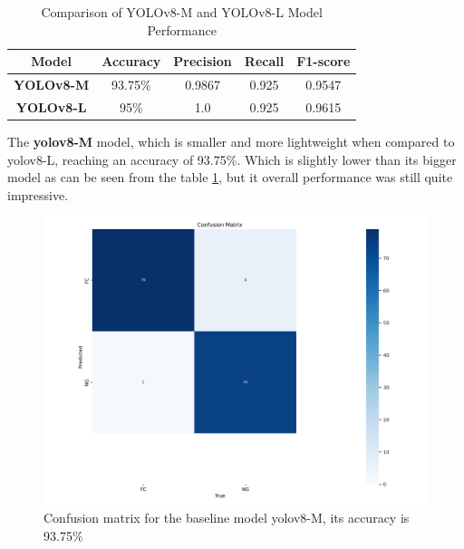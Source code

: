 \begin{table}[ht!]
    \centering
    \begin{tabular}{|c|c|c|c|c|}
        \hline
        \textbf{Model} & \textbf{Accuracy} & \textbf{Precision} & \textbf{Recall} & \textbf{F1-score} \\ \hline
        \textbf{YOLOv8-M} & 93.75\% & 0.9867 & 0.925 & 0.9547 \\ \hline
        \textbf{YOLOv8-L} & 95\% & 1.0 & 0.925 & 0.9615 \\ \hline
    \end{tabular}
    \caption{Comparison of YOLOv8-M and YOLOv8-L Model Performance}
    \label{tab:yolov8_performance}
\end{table}


The \textbf{\gls{yolo}v8-M} model, which is smaller and more lightweight when compared to \gls{yolo}v8-L, reaching an accuracy of 93.75\%. Which is slightly lower than its bigger model as can be seen from the table \ref{tab:yolov8_performance}, but it overall performance was still quite impressive.

\begin{figure}[ht!]
    \centering
    \includegraphics[width=1.3\linewidth]{Rohit_Master_Thesis//Images/yolov8m_confusion_matrix.png}
    \caption{Confusion matrix for the baseline model \gls{yolo}v8-M, its accuracy is 93.75\%}
    \label{fig:yolov8m confusion matrix}
\end{figure}


